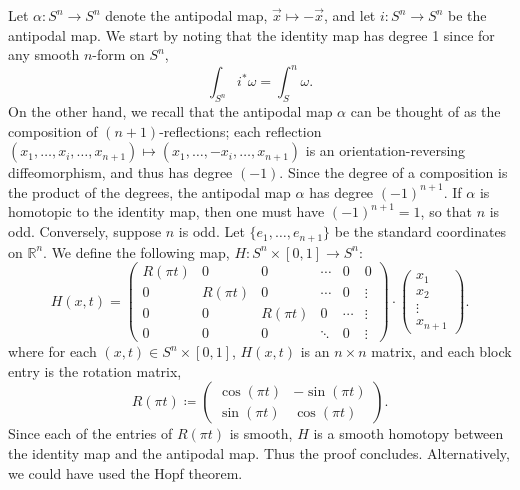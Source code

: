 \documentclass{article}
\begin{document}
	Let $\alpha: S^{n} \to S^{n}$ denote the antipodal map, $\vec{x} \mapsto -\vec{x}$, and let $i: S^{n} \to S^{n}$ be the antipodal map. We start by noting that the identity map has degree 1 since for any smooth $n$-form on $S^{n}$, 
	\begin{equation*}
		\int_{S^{n}}i^{\ast}\omega = \int_{S}^{n}\omega. 
	\end{equation*}
	On the other hand, we recall that the antipodal map $\alpha$ can be thought of as the composition of $(n + 1)$-reflections; each reflection $(x_{1}, \ldots, x_{i}, \ldots, x_{n + 1}) \mapsto (x_{1}, \ldots, -x_{i}, \ldots, x_{n + 1})$ is an orientation-reversing diffeomorphism, and thus has degree $(-1)$. Since the degree of a composition is the product of the degrees, the antipodal map $\alpha$ has degree $(-1)^{n + 1}$. If $\alpha$ is homotopic to the identity map, then one must have $(-1)^{n + 1} = 1$, so that $n$ is odd. Conversely, suppose $n$ is odd. Let $\{e_{1}, \ldots, e_{n + 1}\}$ be the standard coordinates on $\mathbb{R}^{n}$. We define the following map, $H: S^{n} \times [0,1] \to S^{n}$: 
	\begin{equation*}
		H(x, t) = 
		\begin{pmatrix}
			R(\pi t) & 0 & 0 & \dotsm & 0 & 0\\
			0 & R(\pi t) & 0 & \dotsm & 0  & \vdots \\
			0 & 0 & R(\pi t) & 0 & \dotsm & \vdots \\
			0 & 0 & 0 &  \ddots & 0 & \vdots 
		\end{pmatrix}
		\cdot \begin{pmatrix} x_{1} \\ x_{2} \\ \vdots \\ x_{n + 1} \end{pmatrix}.
	\end{equation*}
	where for each $(x, t) \in S^{n} \times [0,1]$, $H(x,t)$ is an $n \times n$ matrix, and each block entry is the rotation matrix, 
	\begin{equation*}
		R(\pi t) \coloneqq \begin{pmatrix} \cos(\pi t) & -\sin(\pi t) \\ \sin(\pi t) & \cos(\pi t) \end{pmatrix}. 
	\end{equation*}
	Since each of the entries of $R(\pi t)$ is smooth, $H$ is a smooth homotopy between the identity map and the antipodal map. Thus the proof concludes. Alternatively, we could have used the Hopf theorem. 
	
\end{document}
